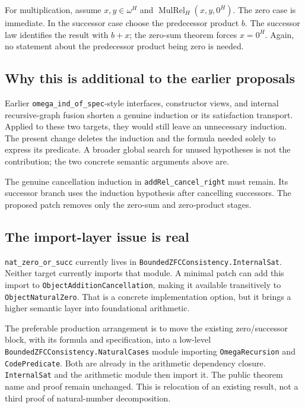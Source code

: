 \documentclass[11pt,letterpaper]{article}
\newcommand{\code}[1]{\nolinkurl{#1}}
\begin{document}
For multiplication, assume $x,y\in\omega^H$ and $\operatorname{MulRel}_H(x,y,0^H)$. The zero case is immediate. In the successor case choose the predecessor product $b$. The successor law identifies the result with $b+x$; the zero-sum theorem forces $x=0^H$. Again, no statement about the predecessor product being zero is needed.

\subsection{Why this is additional to the earlier proposals}

Earlier \code{omega_ind_of_spec}-style interfaces, constructor views, and internal recursive-graph fusion shorten a genuine induction or its satisfaction transport. Applied to these two targets, they would still leave an unnecessary induction. The present change deletes the induction and the formula needed solely to express its predicate. A broader global search for unused hypotheses is not the contribution; the two concrete semantic arguments above are.

The genuine cancellation induction in \code{addRel_cancel_right} must remain. Its successor branch uses the induction hypothesis after cancelling successors. The proposed patch removes only the zero-sum and zero-product stages.

\subsection{The import-layer issue is real}

\code{nat_zero_or_succ} currently lives in \code{BoundedZFCConsistency.InternalSat}. Neither target currently imports that module. A minimal patch can add this import to \code{ObjectAdditionCancellation}, making it available transitively to \code{ObjectNaturalZero}. That is a concrete implementation option, but it brings a higher semantic layer into foundational arithmetic.

The preferable production arrangement is to move the existing zero/successor block, with its formula and specification, into a low-level \code{BoundedZFCConsistency.NaturalCases} module importing \code{OmegaRecursion} and \code{CodePredicate}. Both are already in the arithmetic dependency closure. \code{InternalSat} and the arithmetic module then import it. The public theorem name and proof remain unchanged. This is relocation of an existing result, not a third proof of natural-number decomposition.
\end{document}
